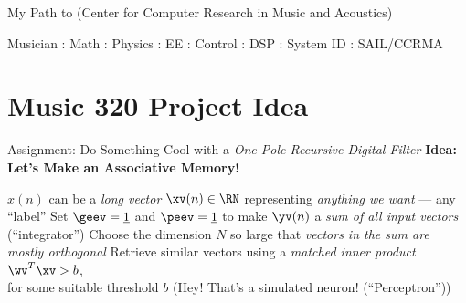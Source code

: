 \begin{slide}[\slideopts,toc={Path to CCRMA}]{My Path to
    (Center for Computer Research in Music and Acoustics)
}

\centerline{Musician : Math : Physics : EE : Control : DSP : System ID : SAIL/CCRMA}
\vspace{1em}

\end{slide}



%

%

\section[\sectopts,toc={Basic Idea}]{Music 320 Project Idea}

\begin{slide}[\slideopts,toc={One Pole Filter}]{Assignment: Do Something Cool with a \emph{One-Pole Recursive Digital Filter}}
\vspace{-1em}
\maybepause
\vspace{-1em}
\textbf{Idea: Let's Make an Associative Memory!}
\begin{itemize}
\mpitem $x(n)$ can be a \emph{long vector} $\xv(n)\in\RN$ representing \emph{anything we want} --- any ``label''
\mpitem Set $\geev = \onevec$ and $\peev = \onevec$ to make $\yv(n)$ a \emph{sum of all input vectors} (``integrator'')
\mpitem Choose the dimension $N$ so large that \emph{vectors in the sum are mostly orthogonal}
\mpitem Retrieve similar vectors using a \emph{matched inner product} $\wv^T\xv > b$,\\
        for some suitable threshold $b$ (Hey! That's a simulated neuron! (``Perceptron''))
\end{itemize}
\end{slide}

